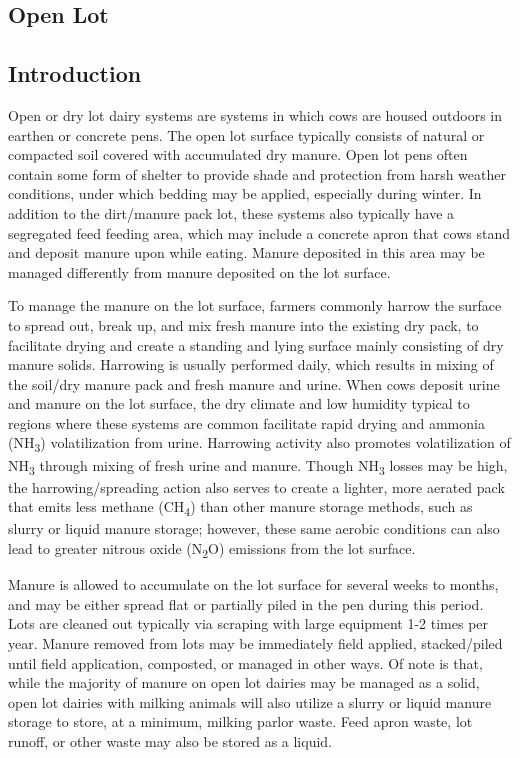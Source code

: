 \begin{refsection}
\section{Open Lot}
 
\subsection{Introduction} 
    \vspace{0.2cm}

    Open or dry lot dairy systems are systems in which cows are housed outdoors in earthen or concrete pens. The open lot surface typically consists of natural or compacted soil covered with accumulated dry manure. Open lot pens often contain some form of shelter to provide shade and protection from harsh weather conditions, under which bedding may be applied, especially during winter. In addition to the dirt/manure pack lot, these systems also typically have a segregated feed feeding area, which may include a concrete apron that cows stand and deposit manure upon while eating. Manure deposited in this area may be managed differently from manure deposited on the lot surface.
    \vspace{0.2cm}

    To manage the manure on the lot surface, farmers commonly harrow the surface to spread out, break up, and mix fresh manure into the existing dry pack, to facilitate drying and create a standing and lying surface mainly consisting of dry manure solids. Harrowing is usually performed daily, which results in mixing of the soil/dry manure pack and fresh manure and urine. When cows deposit urine and manure on the lot surface, the dry climate and low humidity typical to regions where these systems are common facilitate rapid drying and ammonia (NH\textsubscript{3}) volatilization from urine. Harrowing activity also promotes volatilization of NH\textsubscript{3} through mixing of fresh urine and manure. Though NH\textsubscript{3} losses may be high, the harrowing/spreading action also serves to create a lighter, more aerated pack that emits less methane (CH\textsubscript{4}) than other manure storage methods, such as slurry or liquid manure storage; however, these same aerobic conditions can also lead to greater nitrous oxide (N\textsubscript{2}O) emissions from the lot surface.
    \vspace{0.2cm}

    Manure is allowed to accumulate on the lot surface for several weeks to months, and may be either spread flat or partially piled in the pen during this period. Lots are cleaned out typically via scraping with large equipment 1-2 times per year. Manure removed from lots may be immediately field applied, stacked/piled until field application, composted, or managed in other ways. Of note is that, while the majority of manure on open lot dairies may be managed as a solid, open lot dairies with milking animals will also utilize a slurry or liquid manure storage to store, at a minimum, milking parlor waste. Feed apron waste, lot runoff, or other waste may also be stored as a liquid.
    \vspace{0.5cm}


\end{refsection}
